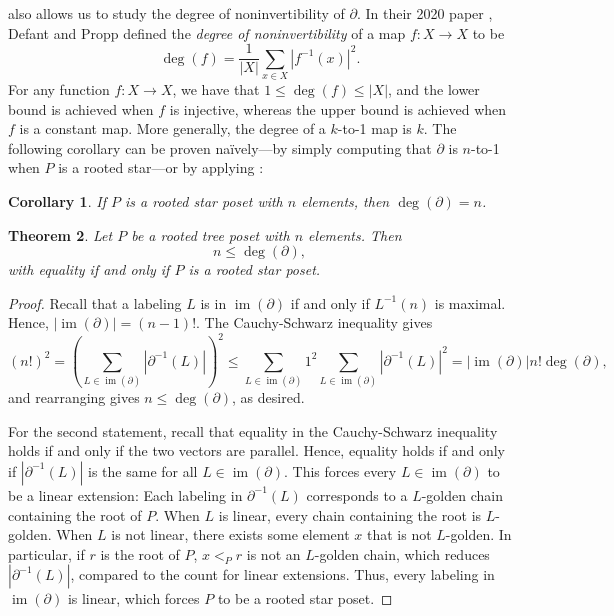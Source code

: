 \documentclass[11pt]{amsart}
\newtheorem{thm}{Theorem}[section]
\newtheorem{corollary}[thm]{Corollary}
\theoremstyle{definition}
\DeclareMathOperator{\im}{\mathrm{im}}
\newcommand{\inverse}{^{-1}}
\begin{document}
 also allows us to study the {degree of noninvertibility} of $ \partial $. In their 2020 paper \cite{DP20}, Defant and Propp defined the \emph{degree of noninvertibility} of a map $ f:X\to X $ to be \[\deg(f)=\frac{1}{|X|}\sum_{x\in X}|f\inverse(x)|^2.\] For any function $ f:X\to X $, we have that $ 1\leq\deg(f)\leq|X| $, and the lower bound is achieved when $ f $ is injective, whereas the upper bound is achieved when $ f $ is a constant map. More generally, the degree of a $ k $-to-1 map is $ k $. The following corollary can be proven na\"{i}vely---by simply computing that $ \partial $ is $ n $-to-1 when $ P $ is a rooted star---or by applying : 
\begin{corollary}\label{star degree}
	If $ P $ is a rooted star poset with $ n $ elements, then $ \deg(\partial)=n $.
\end{corollary}
\begin{thm}\label{noninvertibility bound}
	Let $ P $ be a rooted tree poset with $ n $ elements. Then \[n\leq\deg(\partial),\] with equality if and only if $ P $ is a rooted star poset. 
\end{thm}
\begin{proof}
	Recall that a labeling $ L$ is in $\im(\partial) $ if and only if $ L\inverse(n) $ is maximal. Hence, $ |\im(\partial)|=(n-1)! $. The Cauchy-Schwarz inequality gives \[(n!)^2=\left(\sum_{L\in\im(\partial)}|\partial\inverse(L)|\right)^2\leq\sum_{L\in\im(\partial)}1^2\sum_{L\in\im(\partial)}|\partial\inverse(L)|^2=|\im(\partial)|n!\deg(\partial),\] and rearranging gives $ n\leq\deg(\partial) $, as desired. 
	
	For the second statement, recall that equality in the Cauchy-Schwarz inequality holds if and only if the two vectors are parallel. Hence, equality holds if and only if $ |\partial\inverse(L)| $ is the same for all $ L\in\im(\partial) $. This forces every $ L\in\im(\partial) $ to be a linear extension: Each labeling in $ \partial\inverse(L) $ corresponds to a $ L $-golden chain containing the root of $ P $. When $ L $ is linear, every chain containing the root is $ L $-golden. When $ L $ is not linear, there exists some element $ x $ that is not $ L $-golden. In particular, if $ r $ is the root of $ P$, $ x<_Pr $ is not an $ L $-golden chain, which reduces $ |\partial\inverse(L)| $, compared to the count for linear extensions. Thus, every labeling in $ \im(\partial) $ is linear, which forces $ P $ to be a rooted star poset.
\end{proof}
\end{document}
